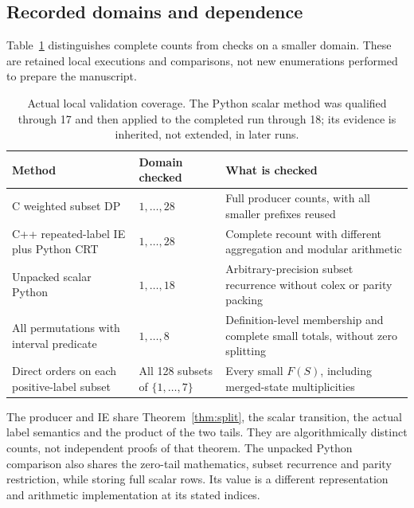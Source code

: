 \documentclass[11pt]{article}
\theoremstyle{definition}
\theoremstyle{remark}
\begin{document}
\subsection{Recorded domains and dependence}

Table~\ref{tab:validation} distinguishes complete counts from checks on a
smaller domain. These are retained local executions and comparisons,
not new enumerations performed to prepare the manuscript.

\begin{table}[htbp]
\centering\small
\begin{tabular}{@{}>{\raggedright\arraybackslash}p{}
 >{\raggedright\arraybackslash}p{}
 >{\raggedright\arraybackslash}p{}@{}}
\toprule
Method & Domain checked & What is checked \\
\midrule
C weighted subset DP & $1,\ldots,28$ & Full producer counts, with all smaller prefixes reused \\
C++ repeated-label IE plus Python CRT & $1,\ldots,28$ & Complete recount with different aggregation and modular arithmetic \\
Unpacked scalar Python & $1,\ldots,18$ & Arbitrary-precision subset recurrence without colex or parity packing \\
All permutations with interval predicate & $1,\ldots,8$ & Definition-level membership and complete small totals, without zero splitting \\
Direct orders on each positive-label subset & All 128 subsets of $\{1,\ldots,7\}$ & Every small $F(S)$, including merged-state multiplicities \\
\bottomrule
\end{tabular}
\caption{Actual local validation coverage. The Python scalar method was
qualified through 17 and then applied to the completed run through 18;
its evidence is inherited, not extended, in later runs.}
\label{tab:validation}
\end{table}

The producer and IE share Theorem~\ref{thm:split}, the scalar transition,
the actual label semantics and the product of the two tails. They are
algorithmically distinct counts, not independent proofs of that theorem.
The unpacked Python comparison also shares the zero-tail mathematics,
subset recurrence and parity restriction, while storing full scalar rows.
Its value is a different representation and arithmetic
implementation at its stated indices.
\end{document}
